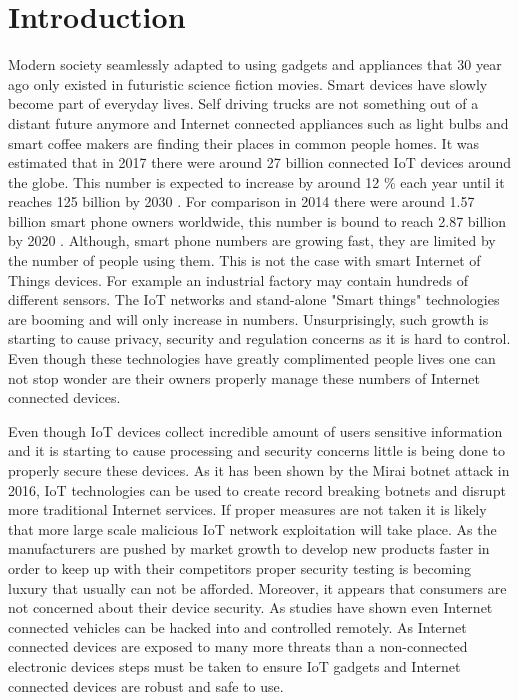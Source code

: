 \section{Introduction}

Modern society seamlessly adapted to using gadgets and appliances that 30 year ago only existed in futuristic science fiction movies. Smart devices have slowly become part of everyday lives. Self driving trucks are not something out of a distant future anymore\cite{freedman_2017} and Internet connected appliances such as light bulbs and  smart coffee makers are finding their places in common people homes. It was estimated that in 2017 there were around 27 billion connected IoT devices around the globe. This number is expected to increase by around 12 \% each year until it reaches 125 billion by 2030 \cite{ihs-markit}. For comparison in 2014 there were around 1.57 billion smart phone owners worldwide, this number is bound to reach 2.87 billion by 2020 \cite{statista}. Although, smart phone numbers are growing fast, they are limited by the number of people using them. This is not the case with smart Internet of Things devices. For example an industrial factory may contain hundreds of different sensors. The IoT networks and stand-alone "Smart things" technologies are booming \cite{gartner2018} and will only increase in numbers. Unsurprisingly, such growth is starting to cause privacy, security and regulation concerns as it is hard to control. Even though these technologies have greatly complimented people lives one can not stop wonder are their owners properly manage these numbers of Internet connected devices.

Even though IoT devices collect incredible amount of users sensitive information and it is starting to cause processing and security concerns \cite{7069995} little is being done to properly secure these devices. As it has been shown by the Mirai botnet attack in 2016, IoT technologies can be used to create record breaking botnets and disrupt more traditional Internet services\cite{203628}. If proper measures are not taken it is likely that more large scale malicious IoT network exploitation will take place. As the manufacturers are pushed by market growth to develop new products faster in order to keep up with their competitors proper security testing is becoming luxury that usually can not be afforded. Moreover, it appears that consumers are not concerned about their device security\cite{iotm}. As studies have shown even Internet connected vehicles can be hacked into and controlled remotely\cite{8071577}. As Internet connected devices are exposed to many more threats than a non-connected electronic devices steps must be taken to ensure IoT gadgets and Internet connected devices are robust and safe to use.

